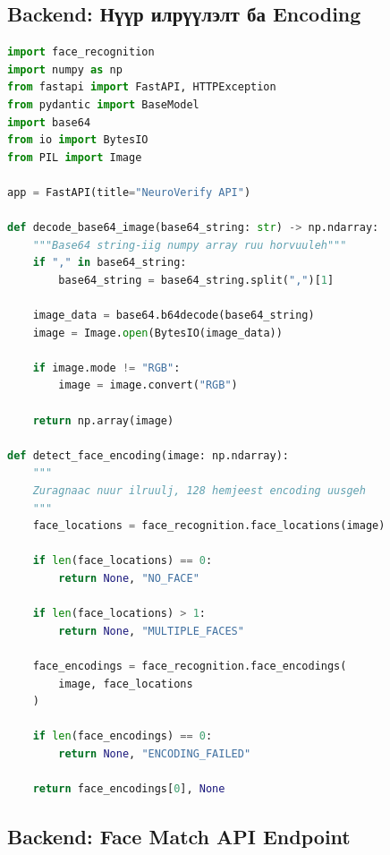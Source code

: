 \documentclass[12pt,a4paper]{article}
\begin{document}
\subsection{Backend: Нүүр илрүүлэлт ба Encoding}

\begin{lstlisting}[language=Python, caption={Face Detection (main.py)}]
import face_recognition
import numpy as np
from fastapi import FastAPI, HTTPException
from pydantic import BaseModel
import base64
from io import BytesIO
from PIL import Image

app = FastAPI(title="NeuroVerify API")

def decode_base64_image(base64_string: str) -> np.ndarray:
    """Base64 string-iig numpy array ruu horvuuleh"""
    if "," in base64_string:
        base64_string = base64_string.split(",")[1]
    
    image_data = base64.b64decode(base64_string)
    image = Image.open(BytesIO(image_data))
    
    if image.mode != "RGB":
        image = image.convert("RGB")
    
    return np.array(image)

def detect_face_encoding(image: np.ndarray):
    """
    Zuragnаас nuur ilruulj, 128 hemjeest encoding uusgeh
    """
    face_locations = face_recognition.face_locations(image)
    
    if len(face_locations) == 0:
        return None, "NO_FACE"
    
    if len(face_locations) > 1:
        return None, "MULTIPLE_FACES"
    
    face_encodings = face_recognition.face_encodings(
        image, face_locations
    )
    
    if len(face_encodings) == 0:
        return None, "ENCODING_FAILED"
    
    return face_encodings[0], None
\end{lstlisting}

\subsection{Backend: Face Match API Endpoint}
\end{document}
